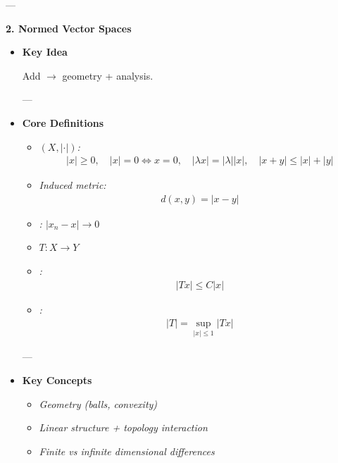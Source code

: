 \documentclass[12pt,a4paper]{report}
\begin{document}
\begin{description}
---

\item \textbf{2. Normed Vector Spaces}

    \begin{itemize}
    \item \textbf{Key Idea}

Add  $\to$ geometry + analysis.

---

    \item \textbf{Core Definitions}

            \begin{itemize}
            \item \textit{ $(X,|\cdot|)$:}
\begin{align*}
  |x|\ge 0,\quad |x|=0 \iff x=0,\quad |\lambda x|=|\lambda||x|,\quad |x+y|\le |x|+|y|
\end{align*}

            \item \textit{Induced metric:}
\begin{align*}
  d(x,y)=|x-y|
\end{align*}

            \item \textit{: $|x_n-x|\to 0$}

            \item \textit{ $T:X\to Y$}

            \item \textit{:}
\begin{align*}
  |Tx|\le C|x|
\end{align*}

            \item \textit{:}
\begin{align*}
  |T|=\sup_{|x|\le 1}|Tx|
\end{align*}

            \end{itemize}
---

    \item \textbf{Key Concepts}

            \begin{itemize}
            \item \textit{Geometry (balls, convexity)}
            \item \textit{Linear structure + topology interaction}
            \item \textit{Finite vs infinite dimensional differences}
            \end{itemize}


\end{itemize}
\end{description}
\end{document}
